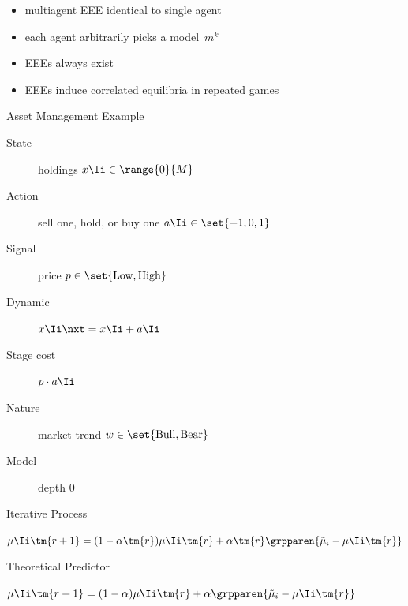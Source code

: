 \recap
\begin{frame}
\begin{itemize}
\item multiagent EEE identical to single agent
\item each agent arbitrarily picks a model~\(m^{k}\)
\item EEEs always exist
\item EEEs induce correlated equilibria in repeated games
\end{itemize}
\end{frame}
\begin{frame}{Asset Management Example}
  \begin{description}
    \item[State] holdings \(x\Ii \in \range{0}{M}\)
    \item[Action] sell one, hold, or buy one \(a\Ii \in \set{-1, 0, 1}\)
    \item[Signal] price \(p \in \set{\textnormal{Low}, \textnormal{High}}\)
    \item[Dynamic] \(x\Ii\nxt = x\Ii + a\Ii\)
    \item[Stage cost] \(p \cdot a\Ii\)
    \item[Nature] market trend \(w \in \set{\textnormal{Bull}, \textnormal{Bear}}\)
    \item[Model] depth 0
  \end{description}
\end{frame}
\begin{frame}{Iterative Process}

\bigskip\bigskip

 \quad \(\mu\Ii\tm{r+1} = (1 - \alpha\tm{r}) \mu\Ii\tm{r} + \alpha\tm{r} \grpparen{\tilde{\mu}_{i} - \mu\Ii\tm{r}}\)
\end{frame}
\begin{frame}{Theoretical Predictor}

\bigskip
{} \quad \(\mu\Ii\tm{r+1} = (1 - \alpha) \mu\Ii\tm{r} + \alpha \grpparen{\tilde{\mu}_{i} - \mu\Ii\tm{r}}\)
\end{frame}
